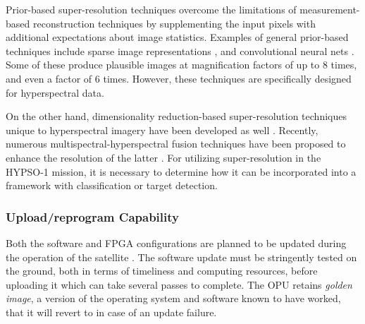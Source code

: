 Prior-based super-resolution techniques overcome the limitations of measurement-based reconstruction techniques by supplementing the input pixels with additional expectations about image statistics. 
Examples of general prior-based techniques include sparse image representations \cite{Yang2010}, and convolutional neural nets \cite{Kim_2016_CVPR,Anwar2020}. 
Some of these produce plausible images at magnification factors of up to 8 times, and even a factor of 6 times. However, these techniques are specifically designed for hyperspectral data. 

On the other hand, dimensionality reduction-based super-resolution techniques unique to hyperspectral imagery have been developed as well \cite{Akgun2005}. Recently, numerous multispectral-hyperspectral fusion techniques have been proposed to enhance the resolution of the latter \cite{Lanaras_2015_ICCV, Yokoya2017}. For utilizing super-resolution in the HYPSO-1 mission, it is necessary to determine how it can be incorporated into a framework with classification or target detection.

\subsubsection{Upload/reprogram Capability}
Both the software and FPGA configurations are planned to be updated during the operation of the satellite \cite{Gjersund2020}. 
The software update must be stringently tested on the ground, both in terms of timeliness and computing resources, before uploading it which can take several passes to complete. 
The OPU retains \textit{golden image}, a version of the operating system and software known to have worked, that it will revert to in case of an update failure. 

